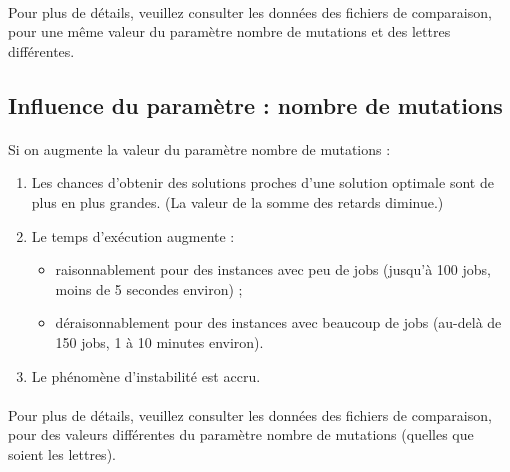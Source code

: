 \paragraph{}
Pour plus de détails, veuillez consulter les données des fichiers de comparaison, pour une même valeur du paramètre \og nombre de mutations \fg{}
et des lettres différentes.

\subsection{Influence du paramètre : nombre de mutations}

\paragraph{}
Si on augmente la valeur du paramètre \og nombre de mutations \fg{} :
\begin{enumerate}
\item Les chances d'obtenir des solutions proches d'une solution optimale sont de plus en plus grandes. (La valeur de la somme des retards diminue.)
\item Le temps d'exécution augmente :
    \begin{itemize}
    \item raisonnablement pour des instances avec peu de jobs (jusqu'à 100 jobs, moins de 5 secondes environ) ;
    \item déraisonnablement pour des instances avec beaucoup de jobs (au-delà de 150 jobs, 1 à 10 minutes environ).
    \end{itemize}
\item Le phénomène d'instabilité est accru.
\end{enumerate}

\paragraph{}
Pour plus de détails, veuillez consulter les données des fichiers de comparaison, pour des valeurs différentes du paramètre \og nombre de mutations \fg{} (quelles que soient les lettres).
